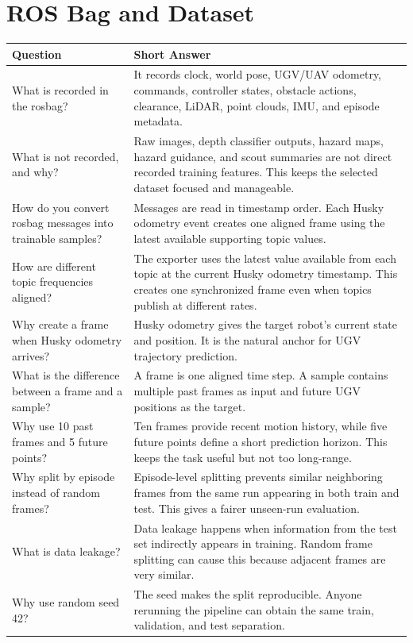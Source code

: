 \documentclass[11pt,a4paper]{article}
\begin{document}
\section*{ROS Bag and Dataset}
\begin{longtable}{QA}
\toprule
\textbf{Question} & \textbf{Short Answer} \\
\midrule
\endhead
What is recorded in the rosbag? &
It records clock, world pose, UGV/UAV odometry, commands, controller states, obstacle actions, clearance, LiDAR, point clouds, IMU, and episode metadata. \\
\addlinespace
What is not recorded, and why? &
Raw images, depth classifier outputs, hazard maps, hazard guidance, and scout summaries are not direct recorded training features. This keeps the selected dataset focused and manageable. \\
\addlinespace
How do you convert rosbag messages into trainable samples? &
Messages are read in timestamp order. Each Husky odometry event creates one aligned frame using the latest available supporting topic values. \\
\addlinespace
How are different topic frequencies aligned? &
The exporter uses the latest value available from each topic at the current Husky odometry timestamp. This creates one synchronized frame even when topics publish at different rates. \\
\addlinespace
Why create a frame when Husky odometry arrives? &
Husky odometry gives the target robot's current state and position. It is the natural anchor for UGV trajectory prediction. \\
\addlinespace
What is the difference between a frame and a sample? &
A frame is one aligned time step. A sample contains multiple past frames as input and future UGV positions as the target. \\
\addlinespace
Why use 10 past frames and 5 future points? &
Ten frames provide recent motion history, while five future points define a short prediction horizon. This keeps the task useful but not too long-range. \\
\addlinespace
Why split by episode instead of random frames? &
Episode-level splitting prevents similar neighboring frames from the same run appearing in both train and test. This gives a fairer unseen-run evaluation. \\
\addlinespace
What is data leakage? &
Data leakage happens when information from the test set indirectly appears in training. Random frame splitting can cause this because adjacent frames are very similar. \\
\addlinespace
Why use random seed 42? &
The seed makes the split reproducible. Anyone rerunning the pipeline can obtain the same train, validation, and test separation. \\
\bottomrule
\end{longtable}
\end{document}
